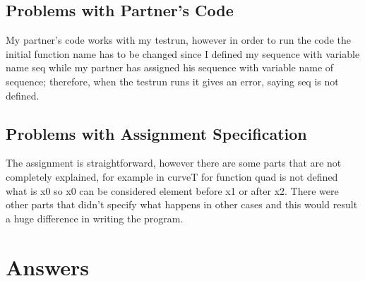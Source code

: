 \documentclass[12pt]{article}
\begin{document}
\subsection{Problems with Partner's Code}
My partner's code works with my testrun, however in order to run the code the initial function name has to be changed since I defined my sequence with variable name seq while my partner has assigned his sequence with variable name of sequence; therefore, when the testrun runs it gives an error, saying seq is not defined.

\subsection{Problems with Assignment Specification}
The assignment is straightforward, however there are some parts that are not completely explained, for example in curveT for function quad is not defined what is x0 so x0 can be considered element before x1 or after x2. There were other parts that didn't specify what happens in other cases and this would result a huge difference in writing the program.

\section{Answers}
\end{document}
